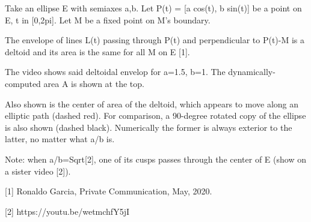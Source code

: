 Take an ellipse E with semiaxes a,b. Let P(t) = [a cos(t), b sin(t)] be a point on E, t in [0,2pi]. Let M be a fixed point on M's boundary.

The envelope of lines L(t) passing through P(t) and perpendicular to P(t)-M is a deltoid and its area is the same for all M on E [1].

The video shows said deltoidal envelop for a=1.5, b=1. The dynamically-computed area A is shown at the top.

Also shown is the center of area of the deltoid, which appears to move along an elliptic path (dashed red). For comparison, a 90-degree rotated copy of the ellipse is also shown (dashed black). Numerically the former is always exterior to the latter, no matter what a/b is.

Note: when a/b=Sqrt[2], one of its cusps passes through the center of E (show on a sister video [2]).

[1] Ronaldo Garcia, Private Communication, May, 2020.

[2] https://youtu.be/wetmchfY5jI